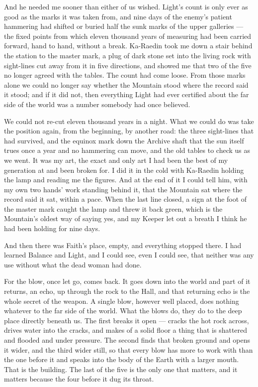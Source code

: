 And he needed me sooner than either of us wished. Light's count is only ever as good as the marks it was taken from, and nine days of the enemy's patient hammering had shifted or buried half the sunk marks of the upper galleries --- the fixed points from which eleven thousand years of measuring had been carried forward, hand to hand, without a break. Ka-Raedin took me down a stair behind the station to the master mark, a plug of dark stone set into the living rock with sight-lines cut away from it in five directions, and showed me that two of the five no longer agreed with the tables. The count had come loose. From those marks alone we could no longer say whether the Mountain stood where the record said it stood; and if it did not, then everything Light had ever certified about the far side of the world was a number somebody had once believed.\par

We could not re-cut eleven thousand years in a night. What we could do was take the position again, from the beginning, by another road: the three sight-lines that had survived, and the equinox mark down the Archive shaft that the sun itself trues once a year and no hammering can move, and the old tables to check us as we went. It was my art, the exact and only art I had been the best of my generation at and been broken for. I did it in the cold with Ka-Raedin holding the lamp and reading me the figures. And at the end of it I could tell him, with my own two hands' work standing behind it, that the Mountain sat where the record said it sat, within a pace. When the last line closed, a sign at the foot of the master mark caught the lamp and threw it back green, which is the Mountain's oldest way of saying yes, and my Keeper let out a breath I think he had been holding for nine days.\par

\ornament

And then there was Faith's place, empty, and everything stopped there. I had learned Balance and Light, and I could see, even I could see, that neither was any use without what the dead woman had done.\par

For the blow, once let go, comes back. It goes down into the world and part of it returns, an echo, up through the rock to the Hall, and that returning echo is the whole secret of the weapon. A single blow, however well placed, does nothing whatever to the far side of the world. What the blows do, they do to the deep place directly beneath us. The first breaks it open --- cracks the hot rock across, drives water into the cracks, and makes of a solid floor a thing that is shattered and flooded and under pressure. The second finds that broken ground and opens it wider, and the third wider still, so that every blow has more to work with than the one before it and speaks into the body of the Earth with a larger mouth. That is the building. The last of the five is the only one that matters, and it matters because the four before it dug its throat.\par


